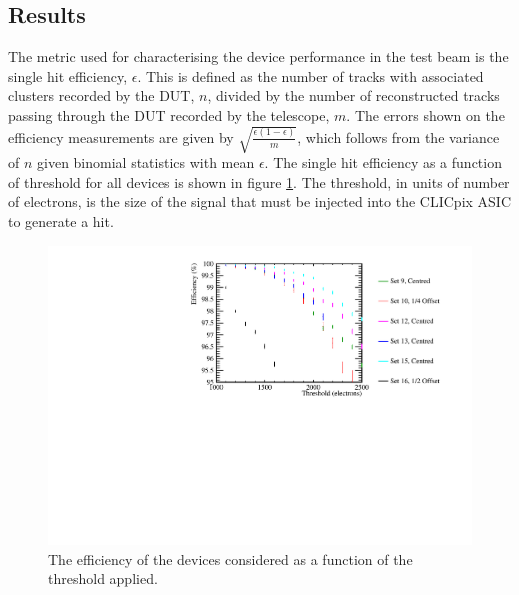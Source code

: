 
\subsection{Results}
The metric used for characterising the device performance in the test beam is the single hit efficiency, $\epsilon$.  This is defined as the number of tracks with associated clusters recorded by the DUT, $n$, divided by the number of reconstructed tracks passing through the DUT recorded by the telescope, $m$. The errors shown on the efficiency measurements are given by $\sqrt{\frac{\epsilon (1 - \epsilon)}{m}}$, which follows from the variance of $n$ given binomial statistics with mean $\epsilon$.  The single hit efficiency as a function of threshold for all devices is shown in figure \ref{fig:efficiency}.  The threshold, in units of number of electrons, is the size of the signal that must be injected into the CLICpix ASIC to generate a hit. 

\begin{figure}
\centering
\includegraphics[width=1.0\textwidth]{CLICdpVertex/Plots/TestBeamData/EfficiencyThresholdPlot.pdf}
\caption[The efficiency of the devices considered as a function of the threshold applied.]{The efficiency of the devices considered as a function of the threshold applied.}
\label{fig:efficiency}
\end{figure}

